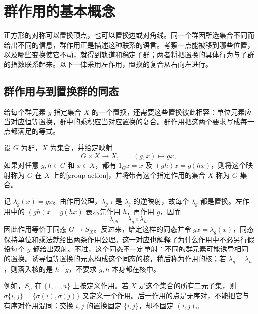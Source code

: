 
\section{群作用的基本概念}
\label{b1:sec:0401}

正方形的对称可以置换顶点，也可以置换边或对角线。同一个群因所选集合不同而给出不同的信息，群作用正是描述这种联系的语言。考察一点能被移到哪些位置，以及哪些变换使它不动，就得到轨道和稳定子群；两者将把置换的具体行为与子群的指数联系起来。以下一律采用左作用，置换的复合从右向左进行。


%
%

\subsection{群作用与到置换群的同态}
\label{b1:subsec:0401:01}

给每个群元素 \(g\) 指定集合 \(X\) 的一个置换，还需要这些置换彼此相容：单位元素应当对应恒等置换，群中的乘积应当对应置换的复合。群作用把这两个要求写成每一点都满足的等式。

\begin{definition}\label{b1:def:group-action}
	设 \(G\) 为群，\(X\) 为集合，并给定映射
	\[
		G\times X\longrightarrow X,\qquad (g,x)\longmapsto gx,
	\]
	如果对任意 \(g,h\in G\) 和 \(x\in X\)，都有 \(1_Gx=x\) 及 \((gh)x=g(hx)\)，则将这个映射称为 \(G\) 在 \(X\) 上的[group action]，并将带有这个指定作用的集合 \(X\) 称为 \(G\)-集合。
\end{definition}

记 \(\lambda_g(x)=gx\)。由作用公理，\(\lambda_{g^{-1}}\) 是 \(\lambda_g\) 的逆映射，故每个 \(\lambda_g\) 都是置换。左作用中的 \((gh)x=g(hx)\) 表示先作用 \(h\)，再作用 \(g\)，因而
\[
	\lambda_{gh}=\lambda_g\circ\lambda_h.
\]
因此作用等价于同态 \(G\rightarrow S_X\)。反过来，给定这样的同态并令 \(gx=\lambda_g(x)\)，同态保持单位和乘法就给出两条作用公理。这一对应也解释了为什么作用中不必另行假设每个 \(g\) 都给出双射。不过，这个同态不一定单射：不同的群元素可能诱导相同的置换。诱导恒等置换的元素构成这个同态的核，稍后称为作用的核；若 \(\lambda_g=\lambda_h\)，则落入核的是 \(h^{-1}g\)，不要求 \(g,h\) 本身都在核中。

\ProseParagraphBreak
例如，\(S_n\) 在 \(\{1,\ldots,n\}\) 上按定义作用。若 \(X\) 是这个集合的所有二元子集，则 \(\sigma\{i,j\}=\bigl\{\sigma(i),\sigma(j)\bigr\}\) 又定义一个作用。后一作用的点是无序对，不能把它与有序对作用混同：交换 \(i,j\) 的置换固定 \(\{i,j\}\)，却不固定 \((i,j)\)。

